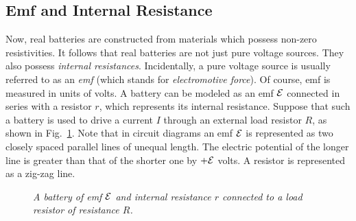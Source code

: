 \subsection{Emf and Internal Resistance}
Now, real batteries are constructed from  materials which possess  non-zero resistivities.
It follows that  real batteries are not just pure voltage sources. They also possess
{\em internal resistances}. 
Incidentally, a pure voltage
source is usually referred to as an {\em emf}\/ (which stands for {\em electromotive force}). Of course,
emf is measured in units of volts. 
A battery can be modeled as an emf ${\cal E}$ connected in series with a resistor
$r$, which represents its internal resistance. Suppose that such
a battery is used to drive a current $I$ through an external load resistor $R$, as
shown in Fig.~\ref{f7.1}.
Note that in circuit diagrams an emf ${\cal E}$ is represented as two closely spaced parallel
lines of unequal length. The electric potential of the longer line is greater than
that of the shorter one by $+{\cal E}$ volts. A resistor is represented as
a zig-zag line. 

\begin{figure}
\epsfysize=2.5in
\centerline{}
\caption{\em A battery of emf ${\cal E}$ and internal resistance $r$ connected
to a load resistor of resistance $R$.}\label{f7.1}
\end{figure}

